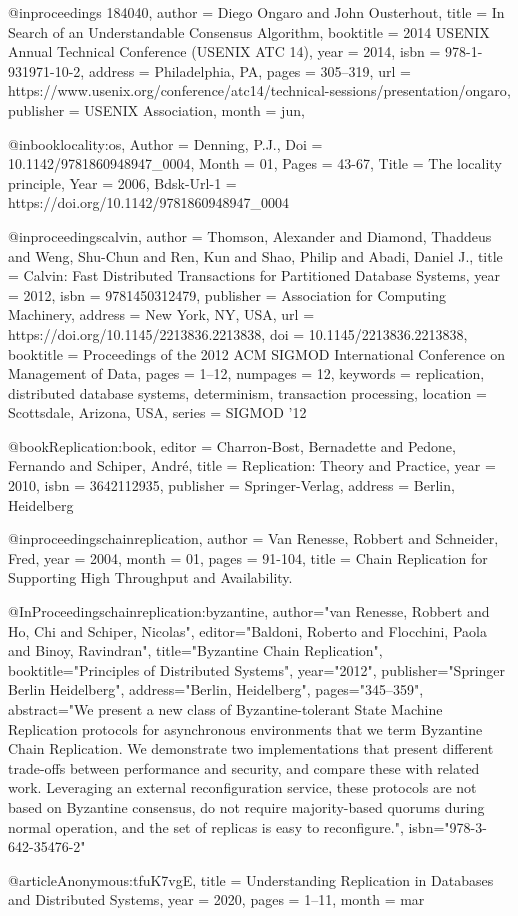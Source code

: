 @inproceedings {184040,
author = {Diego Ongaro and John Ousterhout},
title = {In Search of an Understandable Consensus Algorithm},
booktitle = {2014 {USENIX} Annual Technical Conference ({USENIX} {ATC} 14)},
year = {2014},
isbn = {978-1-931971-10-2},
address = {Philadelphia, PA},
pages = {305--319},
url = {https://www.usenix.org/conference/atc14/technical-sessions/presentation/ongaro},
publisher = {{USENIX} Association},
month = jun,
}


@inbook{locality:os,
	Author = {Denning, P.J.},
	Doi = {10.1142/9781860948947_0004},
	Month = {01},
	Pages = {43-67},
	Title = {The locality principle},
	Year = {2006},
	Bdsk-Url-1 = {https://doi.org/10.1142/9781860948947_0004}}

@inproceedings{calvin,
author = {Thomson, Alexander and Diamond, Thaddeus and Weng, Shu-Chun and Ren, Kun and Shao, Philip and Abadi, Daniel J.},
title = {Calvin: Fast Distributed Transactions for Partitioned Database Systems},
year = {2012},
isbn = {9781450312479},
publisher = {Association for Computing Machinery},
address = {New York, NY, USA},
url = {https://doi.org/10.1145/2213836.2213838},
doi = {10.1145/2213836.2213838},
booktitle = {Proceedings of the 2012 ACM SIGMOD International Conference on Management of Data},
pages = {1–12},
numpages = {12},
keywords = {replication, distributed database systems, determinism, transaction processing},
location = {Scottsdale, Arizona, USA},
series = {SIGMOD ’12}
}


@book{Replication:book,
editor = {Charron-Bost, Bernadette and Pedone, Fernando and Schiper, Andr\'{e}},
title = {Replication: Theory and Practice},
year = {2010},
isbn = {3642112935},
publisher = {Springer-Verlag},
address = {Berlin, Heidelberg}
}

@inproceedings{chainreplication,
author = {Van Renesse, Robbert and Schneider, Fred},
year = {2004},
month = {01},
pages = {91-104},
title = {Chain Replication for Supporting High Throughput and Availability.}
}

@InProceedings{chainreplication:byzantine,
author="van Renesse, Robbert
and Ho, Chi
and Schiper, Nicolas",
editor="Baldoni, Roberto
and Flocchini, Paola
and Binoy, Ravindran",
title="Byzantine Chain Replication",
booktitle="Principles of Distributed Systems",
year="2012",
publisher="Springer Berlin Heidelberg",
address="Berlin, Heidelberg",
pages="345--359",
abstract="We present a new class of Byzantine-tolerant State Machine Replication protocols for asynchronous environments that we term Byzantine Chain Replication. We demonstrate two implementations that present different trade-offs between performance and security, and compare these with related work. Leveraging an external reconfiguration service, these protocols are not based on Byzantine consensus, do not require majority-based quorums during normal operation, and the set of replicas is easy to reconfigure.",
isbn="978-3-642-35476-2"
}


@article{Anonymous:tfuK7vgE,
title = {{Understanding Replication in Databases and Distributed Systems}},
year = {2020},
pages = {1--11},
month = mar
}

